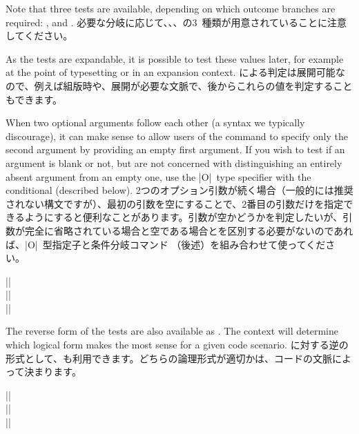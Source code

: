 \documentclass{ltxguide}
\newcommand\jpnewline{\vspace{3pt}\newline}
\begin{document}
Note that three tests are available, depending on which outcome
branches are required: ,  and
.
\jpnewline
必要な分岐に応じて、、、の3~種類が用意されていることに注意してください。

As the  tests are expandable, it is possible to
test these values later, for example at the point of typesetting or
in an expansion context.
\jpnewline
{}による判定は展開可能なので、例えば組版時や、展開が必要な文脈で、後からこれらの値を判定することもできます。

When two optional arguments follow each other (a syntax we typically
discourage), it can make sense to allow users of the command to
specify only the second argument by providing an empty first
argument.
If you wish to test if an argument is blank or not, but are not
concerned with distinguishing an entirely absent argument from
an empty one, use the |O|~type specifier with the
conditional  (described below).
\jpnewline
2つのオプション引数が続く場合（一般的には推奨されない構文ですが）、最初の引数を空にすることで、2番目の引数だけを指定できるようにすると便利なことがあります。引数が空かどうかを判定したいが、引数が完全に省略されている場合と空である場合とを区別する必要がないのであれば、|O|~型指定子と条件分岐コマンド （後述）を組み合わせて使ってください。
\begin{decl}
  |\IfValueTF|    \\
  |\IfValueT|    \\
  |\IfValueF|   
\end{decl}
The reverse form of the  tests are also available
as . The context will determine which logical
form makes the most sense for a given code scenario.
\jpnewline
{}に対する逆の形式として、も利用できます。どちらの論理形式が適切かは、コードの文脈によって決まります。


\begin{decl}[2022/06/01]
  |\IfBlankTF|    \\
  |\IfBlankT|    \\
  |\IfBlankF|   
\end{decl}
\end{document}
